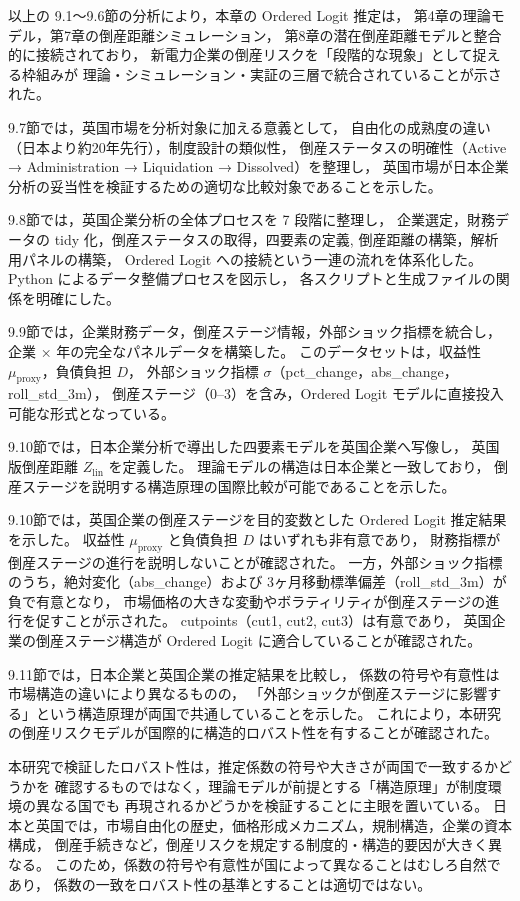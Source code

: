 以上の 9.1〜9.6節の分析により，本章の Ordered Logit 推定は，
第4章の理論モデル，第7章の倒産距離シミュレーション，
第8章の潜在倒産距離モデルと整合的に接続されており，
新電力企業の倒産リスクを「段階的な現象」として捉える枠組みが
理論・シミュレーション・実証の三層で統合されていることが示された。

9.7節では，英国市場を分析対象に加える意義として，
自由化の成熟度の違い（日本より約20年先行），制度設計の類似性，
倒産ステータスの明確性（Active → Administration → Liquidation → Dissolved）を整理し，
英国市場が日本企業分析の妥当性を検証するための適切な比較対象であることを示した。

9.8節では，英国企業分析の全体プロセスを 7 段階に整理し，
企業選定，財務データの tidy 化，倒産ステータスの取得，四要素の定義, 
倒産距離の構築，解析用パネルの構築，
Ordered Logit への接続という一連の流れを体系化した。
Python によるデータ整備プロセスを図示し，
各スクリプトと生成ファイルの関係を明確にした。

9.9節では，企業財務データ，倒産ステージ情報，外部ショック指標を統合し，
企業 × 年の完全なパネルデータを構築した。
このデータセットは，収益性 $\mu_{\text{proxy}}$，負債負担 $D$，
外部ショック指標 $\sigma$（pct\_change，abs\_change，roll\_std\_3m），
倒産ステージ（0--3）を含み，Ordered Logit モデルに直接投入可能な形式となっている。

9.10節では，日本企業分析で導出した四要素モデルを英国企業へ写像し，
英国版倒産距離 $Z_{\text{lin}}$ を定義した。
理論モデルの構造は日本企業と一致しており，
倒産ステージを説明する構造原理の国際比較が可能であることを示した。

9.10節では，英国企業の倒産ステージを目的変数とした Ordered Logit 推定結果を示した。
収益性 $\mu_{\text{proxy}}$ と負債負担 $D$ はいずれも非有意であり，
財務指標が倒産ステージの進行を説明しないことが確認された。
一方，外部ショック指標のうち，絶対変化（abs\_change）および
3ヶ月移動標準偏差（roll\_std\_3m）が負で有意となり，
市場価格の大きな変動やボラティリティが倒産ステージの進行を促すことが示された。
cutpoints（cut1, cut2, cut3）は有意であり，
英国企業の倒産ステージ構造が Ordered Logit に適合していることが確認された。

9.11節では，日本企業と英国企業の推定結果を比較し，
係数の符号や有意性は市場構造の違いにより異なるものの，
「外部ショックが倒産ステージに影響する」という構造原理が両国で共通していることを示した。
これにより，本研究の倒産リスクモデルが国際的に構造的ロバスト性を有することが確認された。

本研究で検証したロバスト性は，推定係数の符号や大きさが両国で一致するかどうかを
確認するものではなく，理論モデルが前提とする「構造原理」が制度環境の異なる国でも
再現されるかどうかを検証することに主眼を置いている。
日本と英国では，市場自由化の歴史，価格形成メカニズム，規制構造，企業の資本構成，
倒産手続きなど，倒産リスクを規定する制度的・構造的要因が大きく異なる。
このため，係数の符号や有意性が国によって異なることはむしろ自然であり，
係数の一致をロバスト性の基準とすることは適切ではない。

